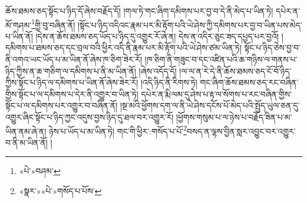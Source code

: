 ཆོས་ཐམས་ཅད་སྟོང་པ་ཉིད་དོ་ཞེས་བརྗོད་དོ། །གལ་ཏེ་གང་ཞིག་དམིགས་པར་བྱ་བ་དེ་ནི་མེད་པ་ཡིན་ཏེ། དཔེར་ན་མོ་གཤམ་\footnote{«པེ་»བཤམ་}གྱི་བུ་བཞིན་ནོ། །སྟོང་པ་ཉིད་འདིའང་རྣམ་པར་མི་རྟོག་པའི་ཡེ་ཤེས་ཀྱི་དམིགས་པར་བྱ་བ་ཡིན་པས་མེད་པ་ཡིན་ནོ། །དེས་ན་ཆོས་ཐམས་ཅད་ཡོད་པ་ཉིད་དུ་འགྱུར་རོ་ཞེ་ན། དེས་ན་འདིར་ཅུང་ཟད་དཔྱད་པར་བྱའོ། །དམིགས་པ་ཐམས་ཅད་དང་བྲལ་བའི་ཕྱིར་འདི་ནི་རྣམ་པར་མི་རྟོག་པའི་ཡེ་ཤེས་ཙམ་ཡིན་ཏེ། སྟོང་པ་ཉིད་ཅེས་བྱ་བ་ནི་འགའ་ཡང་ཡོད་པ་མ་ཡིན་ནོ་ཞེས་ཁ་ཅིག་ཟེར་རོ། །ཁ་ཅིག་ནི་གཟུང་བ་དང་འཛིན་པའི་ཆ་གཉིས་ལ་གནས་པ་ཉིད་ཀྱིས་ན་ཆ་གཅིག་ལ་དམིགས་པ་ནི་མ་ཡིན་ནོ། །ཞེས་འདོད་དོ། །ལ་ལ་ན་རེ་དེ་ནི་ཆོས་ཐམས་ཅད་ངོ་བོ་ཉིད་ཀྱིས་སྟོང་པ་ཉིད་ལ་དམིགས་པ་ཡིན་ནོ་ཞེས་ཟེར་རོ། །འདི་ཉིད་ནི་རིགས་ཏེ། གང་ཞིག་ཆོས་ཐམས་ཅད་རང་བཞིན་གྱིས་སྟོང་པ་ལ་དམིགས་པ་དེར་ནི་འགྱུར་བ་ཡིན་ཏེ། དཔེར་ན་རྨི་ལམ་དུ་ཤེས་པ་རྟ་ལ་སོགས་པ་རང་བཞིན་གྱིས་སྟོང་པ་ལ་དམིགས་པར་འགྱུར་བ་བཞིན་ནོ། །སྔ་མའི་ཕྱོགས་དག་ལ་ནི་ཡེ་ཤེས་དངོས་པོ་མེད་པའི་སྤྱོད་ཡུལ་ཅན་དུ་འགྱུར་ཞིང་སྟོང་པ་ཉིད་ཀྱང་འདུས་བྱས་ཉིད་དུ་ཐལ་བར་འགྱུར་རོ། །ཕྱོགས་གསུམ་པ་ལ་ཉེས་པ་བརྗོད་ཟིན་པ་མ་ཡིན་ནམ་ཞེ་ན། ཉེས་པ་ཡོད་པ་མ་ཡིན་ཏེ། གང་གི་ཕྱིར་:གསོད་པ་པོ་\footnote{«སྣར་»«པེ་»གསོད་པ་པོས་}བསད་ན་ལྷས་བྱིན་སླར་འབྱུང་བར་འགྱུར་བ་ནི་མ་ཡིན་ནོ། །
